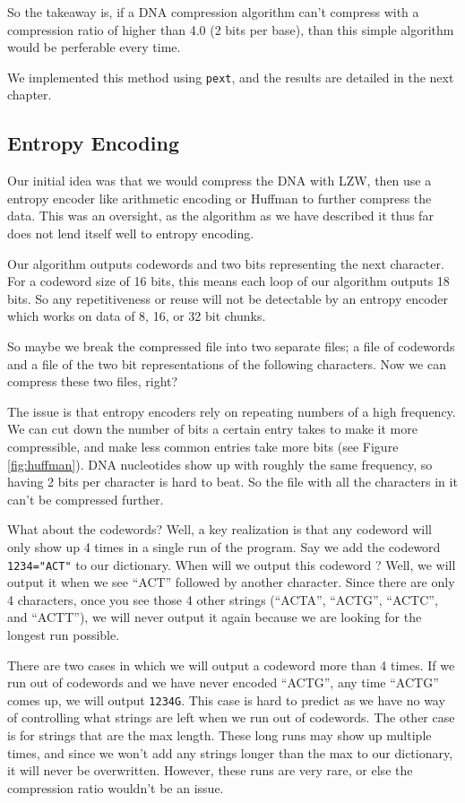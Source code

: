 \documentclass[12pt,twoside]{reedthesis}
\begin{document}
So the takeaway is, if a DNA compression algorithm can't compress with a compression ratio of higher than 4.0 (2 bits per base), than this simple algorithm would be perferable every time.

We implemented this method using \texttt{pext}, and the results are detailed in the next chapter.

\hypertarget{entropy-encoding}{%
\subsection{Entropy Encoding}\label{entropy-encoding}}

Our initial idea was that we would compress the DNA with LZW, then use a entropy encoder like arithmetic encoding or Huffman to further compress the data. This was an oversight, as the algorithm as we have described it thus far does not lend itself well to entropy encoding.

Our algorithm outputs codewords and two bits representing the next character. For a codeword size of 16 bits, this means each loop of our algorithm outputs 18 bits. So any repetitiveness or reuse will not be detectable by an entropy encoder which works on data of 8, 16, or 32 bit chunks.

So maybe we break the compressed file into two separate files; a file of codewords and a file of the two bit representations of the following characters. Now we can compress these two files, right?

The issue is that entropy encoders rely on repeating numbers of a high frequency. We can cut down the number of bits a certain entry takes to make it more compressible, and make less common entries take more bits (see Figure \ref{fig:huffman}). DNA nucleotides show up with roughly the same frequency, so having 2 bits per character is hard to beat. So the file with all the characters in it can't be compressed further.

What about the codewords? Well, a key realization is that any codeword will only show up 4 times in a single run of the program. Say we add the codeword \texttt{1234="ACT"} to our dictionary. When will we output this codeword ? Well, we will output it when we see ``ACT'' followed by another character. Since there are only 4 characters, once you see those 4 other strings (``ACTA'', ``ACTG'', ``ACTC'', and ``ACTT''), we will never output it again because we are looking for the longest run possible.

There are two cases in which we will output a codeword more than 4 times. If we run out of codewords and we have never encoded ``ACTG'', any time ``ACTG'' comes up, we will output \texttt{1234G}. This case is hard to predict as we have no way of controlling what strings are left when we run out of codewords. The other case is for strings that are the max length. These long runs may show up multiple times, and since we won't add any strings longer than the max to our dictionary, it will never be overwritten. However, these runs are very rare, or else the compression ratio wouldn't be an issue.
\end{document}
